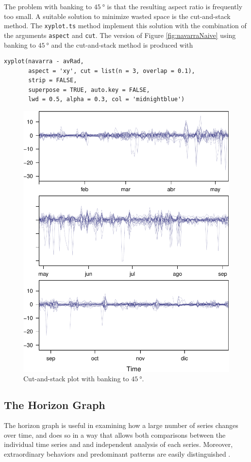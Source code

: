 \documentclass[smallroyalvopaper]{memoir}
\begin{document}
The problem with banking to \(\SI{45}{\degree}\) is that the resulting
aspect ratio is frequently too small. A suitable solution to
minimize wasted space is the cut-and-stack method. The \texttt{xyplot.ts}
method implement this solution with the combination of the
arguments \texttt{aspect} and \texttt{cut}. The version of Figure
\ref{fig:navarraNaive} using banking to \(\SI{45}{\degree}\) and the
cut-and-stack method is produced with
\lstset{language=r,label= ,caption= ,captionpos=b,numbers=none}
\begin{lstlisting}
xyplot(navarra - avRad,
       aspect = 'xy', cut = list(n = 3, overlap = 0.1),
       strip = FALSE,
       superpose = TRUE, auto.key = FALSE,
       lwd = 0.5, alpha = 0.3, col = 'midnightblue')
\end{lstlisting}

\begin{figure}[htbp]
\centering
\includegraphics[width=.9\linewidth]{figs/navarraBanking.pdf}
\caption{Cut-and-stack plot with banking to \(\SI{45}{\degree}\). \label{fig:navarraBanking}}
\end{figure}

\subsection{The Horizon Graph \label{sec:horizonplot}}
\label{sec:orgec3fc34}
The horizon graph is useful in examining how a large number of series
changes over time, and does so in a way that allows both comparisons
between the individual time series and and independent analysis of
each series. Moreover, extraordinary behaviors and predominant
patterns are easily distinguished \cite{Heer.Kong.ea2009,Few2008}.
\end{document}

